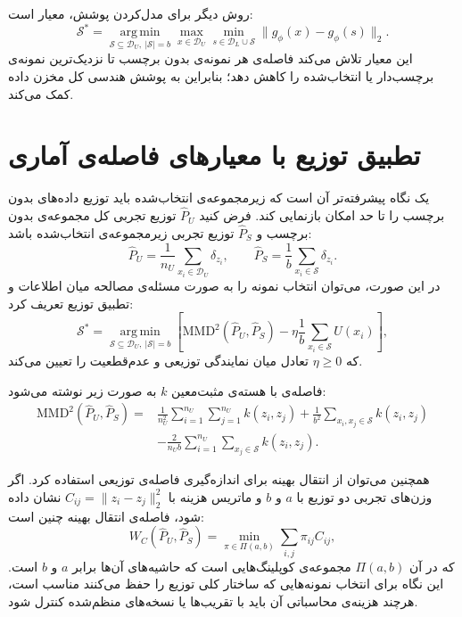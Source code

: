 \documentclass[12pt,a4paper,oneside]{report}
\newcommand{\cD}{\mathcal{D}}
\newcommand{\cS}{\mathcal{S}}
\newcommand{\MMD}{\mathrm{MMD}}
\newcommand{\argmin}{\operatorname*{arg\,min}}
\begin{document}
روش دیگر برای مدل‌کردن پوشش، معیار  است:
\begin{equation}
\cS^*=\argmin_{\cS\subseteq\cD_U,\ |\cS|=b}
\max_{x\in\cD_U}\min_{s\in\cD_L\cup\cS}\|g_\phi(x)-g_\phi(s)\|_2.
\label{eq:kcenter}
\end{equation}
این معیار تلاش می‌کند فاصله‌ی هر نمونه‌ی بدون برچسب تا نزدیک‌ترین نمونه‌ی برچسب‌دار یا انتخاب‌شده را کاهش دهد؛ بنابراین به پوشش هندسی کل مخزن داده کمک می‌کند.

\section{تطبیق توزیع با معیارهای فاصله‌ی آماری}
\label{sec:dal_distribution_matching}

یک نگاه پیشرفته‌تر آن است که زیرمجموعه‌ی انتخاب‌شده باید توزیع داده‌های بدون برچسب را تا حد امکان بازنمایی کند. فرض کنید $\widehat P_U$ توزیع تجربی کل مجموعه‌ی بدون برچسب و $\widehat P_S$ توزیع تجربی زیرمجموعه‌ی انتخاب‌شده باشد:
\begin{equation}
\widehat P_U=\frac{1}{n_U}\sum_{x_i\in\cD_U}\delta_{z_i},
\qquad
\widehat P_S=\frac{1}{b}\sum_{x_i\in\cS}\delta_{z_i}.
\end{equation}
در این صورت، می‌توان انتخاب نمونه را به صورت مسئله‌ی مصالحه میان اطلاعات و تطبیق توزیع تعریف کرد:
\begin{equation}
\cS^*=\argmin_{\cS\subseteq\cD_U,\ |\cS|=b}
\left[
\MMD^2(\widehat P_U,\widehat P_S)
-\eta\frac{1}{b}\sum_{x_i\in\cS}U(x_i)
\right],
\label{eq:mmd_active}
\end{equation}
که $\eta\geq 0$ تعادل میان نمایندگی توزیعی و عدم‌قطعیت را تعیین می‌کند.

فاصله‌ی  با هسته‌ی مثبت‌معین $k$ به صورت زیر نوشته می‌شود:
\begin{align}
\MMD^2(\widehat P_U,\widehat P_S)
=&\frac{1}{n_U^2}\sum_{i=1}^{n_U}\sum_{j=1}^{n_U}k(z_i,z_j)
+\frac{1}{b^2}\sum_{x_i,x_j\in\cS}k(z_i,z_j) \\
&-\frac{2}{n_U b}\sum_{i=1}^{n_U}\sum_{x_j\in\cS}k(z_i,z_j).
\end{align}

همچنین می‌توان از انتقال بهینه برای اندازه‌گیری فاصله‌ی توزیعی استفاده کرد. اگر وزن‌های تجربی دو توزیع با $a$ و $b$ و ماتریس هزینه با $C_{ij}=\|z_i-z_j\|_2^2$ نشان داده شود، فاصله‌ی انتقال بهینه چنین است:
\begin{equation}
W_C(\widehat P_U,\widehat P_S)=
\min_{\pi\in\Pi(a,b)}\sum_{i,j}\pi_{ij}C_{ij},
\end{equation}
که در آن $\Pi(a,b)$ مجموعه‌ی کوپلینگ‌هایی است که حاشیه‌های آن‌ها برابر $a$ و $b$ است. این نگاه برای انتخاب نمونه‌هایی که ساختار کلی توزیع را حفظ می‌کنند مناسب است، هرچند هزینه‌ی محاسباتی آن باید با تقریب‌ها یا نسخه‌های منظم‌شده کنترل شود.
\end{document}
